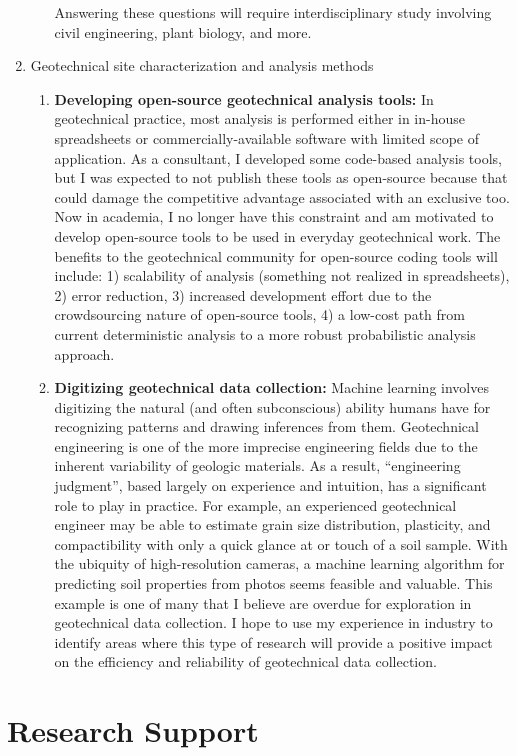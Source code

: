 \documentclass[10pt,letterpaper]{article}
\begin{document}
\begin{enumerate}
\begin{enumerate}
Answering these questions will require interdisciplinary study involving civil engineering, plant biology, and more.
\end{enumerate}
\item Geotechnical site characterization and analysis methods
\begin{enumerate}
\item \textbf{Developing open-source geotechnical analysis tools:} In geotechnical practice, most analysis is performed either in in-house spreadsheets or commercially-available software with limited scope of application.
As a consultant, I developed some code-based analysis tools, but I was expected to not publish these tools as open-source because that could damage the competitive advantage associated with an exclusive too.
Now in academia, I no longer have this constraint and am motivated to develop open-source tools to be used in everyday geotechnical work.
The benefits to the geotechnical community for open-source coding tools will include:
1) scalability of analysis (something not realized in spreadsheets),
2) error reduction,
3) increased development effort due to the crowdsourcing nature of open-source tools,
4) a low-cost path from current deterministic analysis to a more robust probabilistic analysis approach.
\item \textbf{Digitizing geotechnical data collection:} Machine learning involves digitizing the natural (and often subconscious) ability humans have for recognizing patterns and drawing inferences from them.
Geotechnical engineering is one of the more imprecise engineering fields due to the inherent variability of geologic materials.
As a result, ``engineering judgment'', based largely on experience and intuition, has a significant role to play in practice.
For example, an experienced geotechnical engineer may be able to estimate grain size distribution, plasticity, and compactibility with only a quick glance at or touch of a soil sample.
With the ubiquity of high-resolution cameras, a machine learning algorithm for predicting soil properties from photos seems feasible and valuable.
This example is one of many that I believe are overdue for exploration in geotechnical data collection.
I hope to use my experience in industry to identify areas where this type of research will provide a positive impact on the efficiency and reliability of geotechnical data collection.
\end{enumerate}
\end{enumerate}

\section{Research Support}
\end{document}

